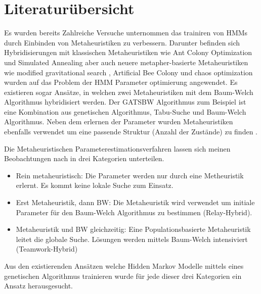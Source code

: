 \section*{Literaturübersicht}
Es wurden bereits Zahlreiche Versuche unternommen das trainiren von HMMs durch Einbinden von Metaheuristiken zu verbessern. Darunter befinden sich Hybridisierungen mit klassischen Metaheuristiken wie Ant Colony Optimization \cite*{LiteratureReviewACO} und Simulated Annealing \cite*{LiteratureReviewSA} aber auch neuere metapher-basierte Metaheuristiken wie modified gravitational search \cite*{LiteratureReviewMGS}, Artificial Bee Colony \cite*{LiteratureReviewABC} und chaos optimization \cite*{LiteratureReviewCO} wurden auf das Problem der HMM Parameter optimierung angewendet. Es existieren sogar Ansätze, in welchen zwei Metaheuristiken mit dem Baum-Welch Algorithmus hybridisiert werden. Der GATSBW Algorithmus \cite*{LiteratureReviewGATSBW} zum Beispiel ist eine Kombination aus genetischen Algorithmus, Tabu-Suche und Baum-Welch Algorithmus. Neben dem erlernen der Parameter wurden Metaheuristiken ebenfalls verwendet um eine passende Struktur (Anzahl der Zustände) zu finden \cite*{LiteratureReviewStructure}.

Die Metaheuristischen Parameterestimationsverfahren lassen sich meinen Beobachtungen nach in drei Kategorien unterteilen.
\begin{itemize}
    \item Rein metaheuristisch: Die Parameter werden nur durch eine Metheuristik erlernt. Es kommt keine lokale Suche zum Einsatz.
    \item Erst Metaheuristik, dann BW: Die Metaheuristik wird verwendet um initiale Parameter für den Baum-Welch Algorithmus zu bestimmen (Relay-Hybrid).
    \item Metaheuristik und BW gleichzeitig: Eine Populationsbasierte Metaheuristik leitet die globale Suche. Lösungen werden mittels Baum-Welch intensiviert (Teamwork-Hybrid) 
\end{itemize}
Aus den existierenden Ansätzen welche Hidden Markov Modelle mittels eines genetischen Algorithmus trainieren wurde für jede dieser drei Kategorien ein Ansatz herausgesucht.


